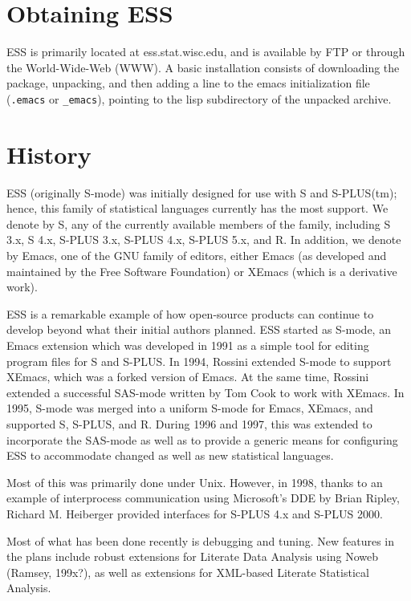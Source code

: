 \documentclass{article}
\begin{document}
\section{Obtaining ESS}
\label{sec:getIt}

ESS is primarily located at ess.stat.wisc.edu, and is available by FTP
or through the World-Wide-Web (WWW).  A basic installation consists of
downloading the package, unpacking, and then adding a line to the
emacs initialization file (\verb+.emacs+ or \verb+_emacs+), pointing
to the lisp subdirectory of the unpacked archive.

\section{History}
\label{sec:history}

ESS (originally S-mode) was initially designed for use with S and
S-PLUS(tm); hence, this family of statistical languages currently has
the most support.  We denote by S, any of the currently available
members of the family, including S 3.x, S 4.x, S-PLUS 3.x, S-PLUS 4.x,
S-PLUS 5.x, and R.  In addition, we denote by Emacs, one of the GNU
family of editors, either Emacs (as developed and maintained by the
Free Software Foundation) or XEmacs (which is a derivative work).

ESS is a remarkable example of how open-source products can continue
to develop beyond what their initial authors planned.  ESS started as
S-mode, an Emacs extension which was developed in 1991 as a simple
tool for editing program files for S and S-PLUS.  In 1994, Rossini
extended S-mode to support XEmacs, which was a forked version of
Emacs.  At the same time, Rossini extended a successful SAS-mode
written by Tom Cook to work with XEmacs.  In 1995, S-mode was merged
into a uniform S-mode for Emacs, XEmacs, and supported S, S-PLUS, and
R.  During 1996 and 1997, this was extended to incorporate the
SAS-mode as well as to provide a generic means for configuring ESS to
accommodate changed as well as new statistical languages.

Most of this was primarily done under Unix.  However, in 1998, thanks
to an example of interprocess communication using Microsoft's DDE by
Brian Ripley, Richard M. Heiberger provided interfaces for S-PLUS 4.x
and S-PLUS 2000.

Most of what has been done recently is debugging and tuning.  New
features in the plans include robust extensions for Literate Data
Analysis using Noweb (Ramsey, 199x?), as well as extensions for
XML-based Literate Statistical Analysis.
\end{document}

